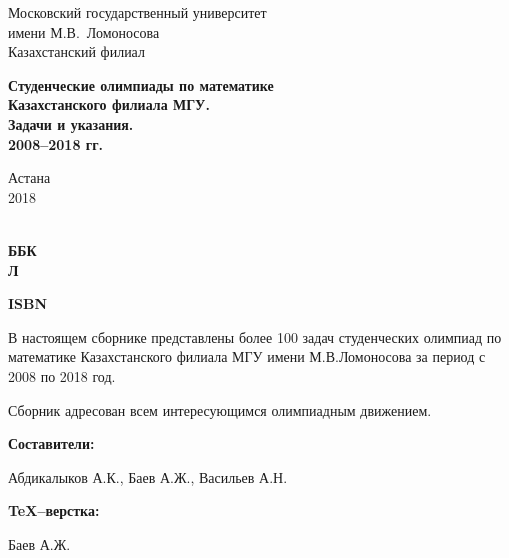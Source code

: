 \documentclass[12pt, a5paper]{article}
\begin{document}
\begin{titlepage}
\begin{center}
\vfill

Московский государственный университет\\
имени М.В.~Ломоносова\\
Казахстанский филиал\\

\vfill

{\large\bf 
Студенческие олимпиады по математике\\
Казахстанского филиала МГУ.\\
Задачи и указания. \\
2008--2018 гг.\\}

\vfill

Астана\\
2018
\end{center}
\end{titlepage}

\setcounter{page}{2}


\thispagestyle{empty}

 \\
{\bf ББК}\\
{\bf Л}
\vspace{0.7 cm}


{\bf ISBN}  

\vspace{0.7 cm}

В настоящем сборнике представлены более 100 задач студенческих олимпиад по математике Казахстанского филиала МГУ имени М.В.Ломоносова за период с 2008 по 2018 год.

Сборник  адресован  всем интересующимся олимпиадным движением.

\vspace{0.5 cm}

{\bf Составители:}

Абдикалыков А.К., Баев А.Ж., Васильев А.Н.

\vspace{0.5 cm}


{\bf TeX--верстка:}

Баев А.Ж.
\end{document}
